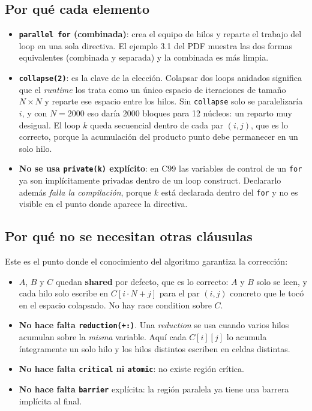\subsection{Por qué cada elemento}

\begin{itemize}
    \item \textbf{\texttt{parallel for} (combinada)}: crea el equipo de hilos y reparte el trabajo del loop en una sola directiva. El ejemplo 3.1 del PDF muestra las dos formas equivalentes (combinada y separada) y la combinada es más limpia.
    \item \textbf{\texttt{collapse(2)}}: es la clave de la elección. Colapsar dos loops anidados significa que el \textit{runtime} los trata como un único espacio de iteraciones de tamaño $N \times N$ y reparte ese espacio entre los hilos. Sin \texttt{collapse} solo se paralelizaría $i$, y con $N=2000$ eso daría 2000 bloques para 12 núcleos: un reparto muy desigual. El loop $k$ queda secuencial dentro de cada par $(i,j)$, que es lo correcto, porque la acumulación del producto punto debe permanecer en un solo hilo.
    \item \textbf{No se usa \texttt{private(k)} explícito}: en C99 las variables de control de un \texttt{for} ya son implícitamente privadas dentro de un loop construct. Declararlo además \emph{falla la compilación}, porque $k$ está declarada dentro del \texttt{for} y no es visible en el punto donde aparece la directiva.
\end{itemize}

\subsection{Por qué no se necesitan otras cláusulas}

Este es el punto donde el conocimiento del algoritmo garantiza la corrección:

\begin{itemize}
    \item $A$, $B$ y $C$ quedan \textbf{shared} por defecto, que es lo correcto: $A$ y $B$ solo se leen, y cada hilo solo escribe en $C[i \cdot N + j]$ para el par $(i,j)$ concreto que le tocó en el espacio colapsado. No hay race condition sobre $C$.
    \item \textbf{No hace falta \texttt{reduction(+:)}}. Una \textit{reduction} se usa cuando varios hilos acumulan sobre la \emph{misma} variable. Aquí cada $C[i][j]$ lo acumula íntegramente un solo hilo y los hilos distintos escriben en celdas distintas.
    \item \textbf{No hace falta \texttt{critical} ni \texttt{atomic}}: no existe región crítica.
    \item \textbf{No hace falta \texttt{barrier}} explícita: la región paralela ya tiene una barrera implícita al final.
\end{itemize}

